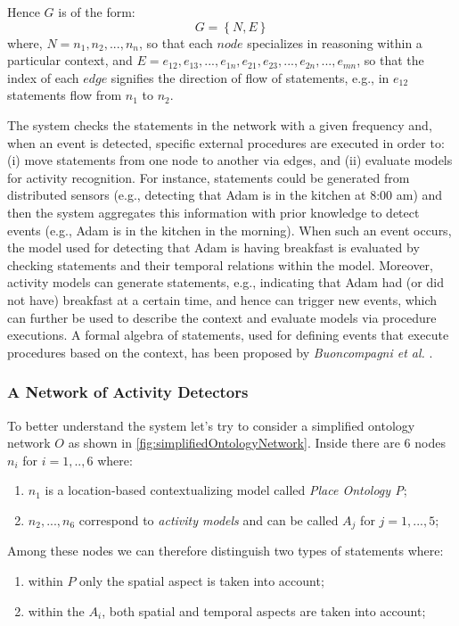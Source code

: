 \documentclass{thesisreport}
\begin{document}
 Hence $G$ is of the form:
 \begin{equation}
     G = \left \{ N, E \right \}
 \end{equation}
 where, $N = n_1, n_2, ... , n_n$, so that each $node$ specializes in reasoning within a particular context, and $ E = e_{12},e_{13},...,e_{1n},e_{21},e_{23},...,e_{2n},...,e_{mn}$, so that the index of each $edge$ signifies the direction of flow of statements, e.g., in $e_{12}$ statements flow from $n_1$ to $n_2$. 
 
 The system checks the statements in the network with a given frequency and, when an event is detected, specific external procedures are executed in order to: (i) move statements from one node to another via edges, and (ii) evaluate models for activity recognition. For instance, statements could be generated from distributed sensors (e.g., detecting that Adam is in the kitchen at 8:00 am) and then the system aggregates this information with prior knowledge to detect events (e.g., Adam is in the kitchen in the morning). When such an event occurs, the model used for detecting that Adam is having breakfast is evaluated by checking statements and their temporal relations within the model.
 Moreover, activity models can generate statements, e.g., indicating that Adam had (or did not have) breakfast at a certain time, and hence can trigger new events, which can further be used to describe the context and evaluate models via procedure executions. A formal algebra of statements, used for defining events that execute procedures based on the context, has been proposed by \textit{Buoncompagni et al.} \cite{buoncompagni2017towards}.
 
 \subsubsection{A Network of Activity Detectors}
 To better understand the system let's try to consider a simplified ontology network $O$ as shown in \ref{fig:simplifiedOntologyNetwork}.
 Inside there are 6 nodes $n_i$ for $i=1,..,6$ where:
 \begin{enumerate}
    \item $n_1$ is a location-based contextualizing model called \textit{Place Ontology P};
    \item $n_2,...,n_6$ correspond to \textit{activity models} and can be called $A_j$ for $j=1,...,5$;
 \end{enumerate}
 
 Among these nodes we can therefore distinguish two types of statements where:
 \begin{enumerate}
     \item within $P$ only the spatial aspect is taken into account;
     \item within the $A_i$, both spatial and temporal aspects are taken into account;
 \end{enumerate}
 
\end{document}
